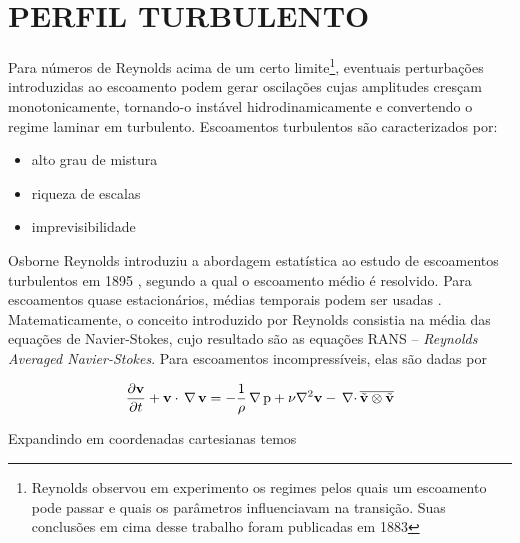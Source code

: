 
\section{PERFIL TURBULENTO}

Para números de Reynolds acima de um certo limite\footnote{Reynolds
observou em experimento os regimes pelos quais um escoamento pode passar
e quais os parâmetros influenciavam na transição. Suas conclusões em
cima desse trabalho foram publicadas em
1883\cite{REYNOLDS83,DAVIDSON11}}, eventuais perturbações introduzidas
ao escoamento podem gerar oscilações cujas amplitudes cresçam
monotonicamente, tornando-o instável hidrodinamicamente e convertendo o
regime laminar em turbulento. Escoamentos turbulentos são caracterizados
por:

\begin{itemize}
\item alto grau de mistura
\item riqueza de escalas
\item imprevisibilidade
\end{itemize}

Osborne Reynolds introduziu a abordagem estatística ao estudo de
escoamentos turbulentos em 1895 \cite{REYNOLDS95}, segundo a qual o
escoamento médio é resolvido. Para escoamentos quase estacionários,
médias temporais podem ser usadas \cite{FREIRE02}. Matematicamente, o
conceito introduzido por Reynolds consistia na média das equações de
Navier-Stokes, cujo resultado são as equações RANS -- \textit{Reynolds
Averaged Navier-Stokes}. Para escoamentos incompressíveis, elas são
dadas por

\begin{equation}
  \frac{\partial\mathbf{v}}{\partial t}+\mathbf{v}\cdot\,\rm \nabla\,\mathbf{v}=-\frac{1}{\rho}\,\rm \nabla\, p+\nu\nabla^2\mathbf{v}-{\,\nabla\cdot}\,\overline{\tilde{\mathbf{v}}\otimes\tilde{\mathbf{v}}}
  \label{eq:rans_incompressivel_1}
\end{equation}

Expandindo em coordenadas cartesianas temos

